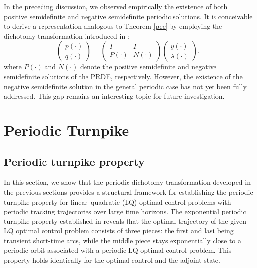 \documentclass{IEEEtran}
\begin{document}
	\begin{remark}
		In the preceding discussion, we observed empirically the existence of both positive semidefinite and negative semidefinite periodic solutions. It is conceivable to derive a representation analogous to Theorem \ref{pee} by employing the dichotomy transformation introduced in \cite{WK}:
		\begin{equation*}
			\begin{pmatrix}
				p(\cdot)\\ q (\cdot)
			\end{pmatrix}=
			\begin{pmatrix}
				I & I \\
				P(\cdot) & N(\cdot)
			\end{pmatrix}
			\begin{pmatrix}
				y(\cdot)\\ \lambda (\cdot)
			\end{pmatrix},
		\end{equation*}
		where $P(\cdot)$ and $N(\cdot)$ denote the positive semidefinite and negative semidefinite solutions of the PRDE, respectively. However, the existence of the negative semidefinite solution in the general periodic case has not yet been fully addressed. This gap remains an interesting topic for future investigation.
	\end{remark}
	
	\section{Periodic Turnpike}\label{Ap2}
	
	\subsection{Periodic turnpike property}\label{pt}
	In this section, we show that the periodic dichotomy transformation developed in the previous sections provides a structural framework for establishing the periodic turnpike property for linear--quadratic (LQ) optimal control problems with periodic tracking trajectories over large time horizons.
	The exponential periodic turnpike property established in \cite{TZZ2} reveals that the optimal trajectory of the given LQ optimal control problem consists of three pieces: the first and last being transient short-time arcs, while the middle piece stays exponentially close to a periodic orbit associated with a periodic LQ optimal control problem. This property holds identically for the optimal control and the adjoint state.
	
\end{document}
